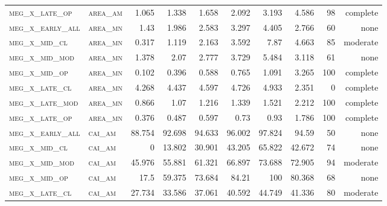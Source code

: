 \begin{landscape}
\begin{center}
\begin{footnotesize}
\begin{longtable}{llrrrrr|rrr}
\textsc{meg\_x\_late\_op  } & \textsc{area\_am  }    & 1.065    & 1.338    & 1.658    & 2.092    & 3.193     & 4.586         & 98            & complete              \\
\textsc{meg\_x\_early\_all} & \textsc{area\_mn  }    & 1.43     & 1.986    & 2.583    & 3.297    & 4.405     & 2.766         & 60            & none              \\
\textsc{meg\_x\_mid\_cl   } & \textsc{area\_mn  }    & 0.317    & 1.119    & 2.163    & 3.592    & 7.87      & 4.663         & 85            & moderate              \\
\textsc{meg\_x\_mid\_mod  } & \textsc{area\_mn  }    & 1.378    & 2.07     & 2.777    & 3.729    & 5.484     & 3.118         & 61            & none              \\
\textsc{meg\_x\_mid\_op   } & \textsc{area\_mn  }    & 0.102    & 0.396    & 0.588    & 0.765    & 1.091     & 3.265         & 100           & complete             \\
\textsc{meg\_x\_late\_cl  } & \textsc{area\_mn  }    & 4.268    & 4.437    & 4.597    & 4.726    & 4.933     & 2.351         & 0             & complete            \\
\textsc{meg\_x\_late\_mod } & \textsc{area\_mn  }    & 0.866    & 1.07     & 1.216    & 1.339    & 1.521     & 2.212         & 100           & complete             \\
\textsc{meg\_x\_late\_op  } & \textsc{area\_mn  }    & 0.376    & 0.487    & 0.597    & 0.73     & 0.93      & 1.786         & 100           & complete             \\
\textsc{meg\_x\_early\_all} & \textsc{cai\_am   }    & 88.754   & 92.698   & 94.633   & 96.002   & 97.824    & 94.59         & 50            & none               \\
\textsc{meg\_x\_mid\_cl   } & \textsc{cai\_am   }    & 0        & 13.802   & 30.901   & 43.205   & 65.822    & 42.672        & 74            & none              \\
\textsc{meg\_x\_mid\_mod  } & \textsc{cai\_am   }    & 45.976   & 55.881   & 61.321   & 66.897   & 73.688    & 72.905        & 94            & moderate              \\
\textsc{meg\_x\_mid\_op   } & \textsc{cai\_am   }    & 17.5     & 59.375   & 73.684   & 84.21    & 100       & 80.368        & 68            & none              \\
\textsc{meg\_x\_late\_cl  } & \textsc{cai\_am   }    & 27.734   & 33.586   & 37.061   & 40.592   & 44.749    & 41.336        & 80            & moderate              \\

\end{longtable}
\end{footnotesize}
\end{center}
\end{landscape}
